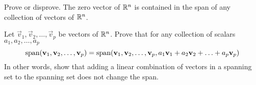 \documentclass{ximera}
\begin{document}
\begin{problem}Prove or disprove.  The zero vector of $\RR^n$ is contained in the span of any collection of vectors of $\RR^n$.
\end{problem}

\begin{problem}
Let $\vec{v}_1,\vec{v}_2,\ldots ,\vec{v}_p$ be vectors of $\RR^n$.  Prove that for any collection of scalars $a_1, a_2,\ldots ,a_p$ 
$$\textnormal{span}(\vec{v}_1,\vec{v}_2,\ldots ,\vec{v}_p)=\textnormal{span}(\vec{v}_1,\vec{v}_2,\ldots ,\vec{v}_p,a_1\vec{v}_1+a_2\vec{v}_2+\ldots +a_p\vec{v}_p)$$
In other words, show that adding a linear combination of vectors in a spanning set to the spanning set does not change the span.
\end{problem}

\end{document}
